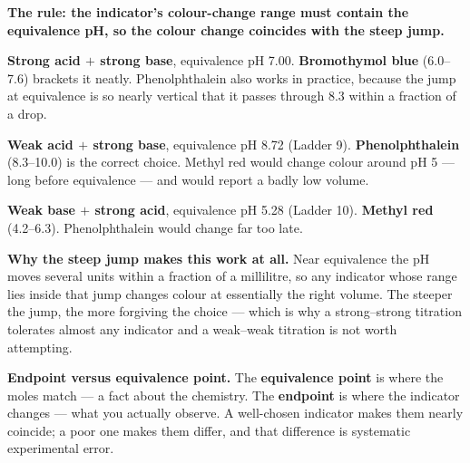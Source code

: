 \documentclass{apchem-worksheet}
\begin{document}
\begin{workedexample}
\textbf{The rule: the indicator's colour-change range must contain the
equivalence pH, so the colour change coincides with the steep jump.}

\textbf{Strong acid $+$ strong base}, equivalence pH 7.00.
\textbf{Bromothymol blue} (6.0--7.6) brackets it neatly. Phenolphthalein
also works in practice, because the jump at equivalence is so nearly
vertical that it passes through 8.3 within a fraction of a drop.

\textbf{Weak acid $+$ strong base}, equivalence pH 8.72 (Ladder 9).
\textbf{Phenolphthalein} (8.3--10.0) is the correct choice. Methyl red
would change colour around pH 5 --- long before equivalence --- and
would report a badly low volume.

\textbf{Weak base $+$ strong acid}, equivalence pH 5.28 (Ladder 10).
\textbf{Methyl red} (4.2--6.3). Phenolphthalein would change far too
late.

\textbf{Why the steep jump makes this work at all.} Near equivalence the
pH moves several units within a fraction of a millilitre, so any
indicator whose range lies inside that jump changes colour at
essentially the right volume. The steeper the jump, the more forgiving
the choice --- which is why a strong--strong titration tolerates almost
any indicator and a weak--weak titration is not worth attempting.

\textbf{Endpoint versus equivalence point.} The \textbf{equivalence
point} is where the moles match --- a fact about the chemistry. The
\textbf{endpoint} is where the indicator changes --- what you actually
observe. A well-chosen indicator makes them nearly coincide; a poor one
makes them differ, and that difference is systematic experimental error.
\end{workedexample}
\end{document}
